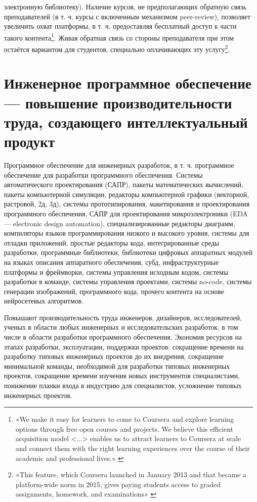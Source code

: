 \documentclass{article}
\begin{document}
электронную библиотеку). Наличие курсов, не предполагающих обратную связь преподавателей (в т. ч. курсы с включенным механизмом peer-review), позволяет увеличить охват платформы, в т. ч. предоставляя бесплатный доступ к части такого контента\footnote{«We make it easy for learners to come to Coursera and explore learning options through free open courses and projects. We believe this efficient acquisition model <...> enables us to attract learners to Coursera at scale and connect them with the right learning experiences over the course of their academic and professional lives.» \cite{courseraS1}}. Живая обратная связь со стороны преподавателя при этом остаётся вариантом для студентов, специально оплачивающих эту услугу\footnote{«This feature, which Coursera launched in January 2013 and that became a platform-wide norm in 2015, gives paying students access to graded assignments, homework, and examinations» \cite{howCourseraMakesMoney2022}}.

\section*{Инженерное программное обеспечение — повышение производительности труда, создающего интеллектуальный продукт}

Программное обеспечение для инженерных разработок, в т. ч. программное обеспечение для разработки программного обеспечения. Системы автоматического проектирования (САПР), пакеты математических вычислений, пакеты компьютерной симуляции, редакторы компьютерной графики (векторной, растровой, 2д, 3д), системы прототипирования, макетирования и проектирования программного обеспечения, САПР для проектирования микроэлектроники (EDA — electronic design automation), специализированные редакторы диаграмм, компиляторы языков программирования низкого и высокого уровня, системы для отладки приложений, простые редакторы кода, интегрированные среды разработки, программные библиотеки, библиотеки цифровых аппаратных модулей на языках описания аппаратного обеспечения, субд, инфраструктурные платформы и фреймворки, системы управления исходным кодом, системы разработки в команде, системы управления проектами, системы no-code, системы генерации изображений, программного кода, прочего контента на основе нейросетевых алгоритмов.

Повышают производительность труда инженеров, дизайнеров, исследователей, ученых в области любых инженерных и исследовательских разработок, в том числе в области разработки программного обеспечения. Экономия ресурсов на этапах разработки, эксплуатации, поддержки проектов: сокращение времени на разработку типовых инженерных проектов до их внедрения, сокращение минимальной команды, необходимой для разработки типовых инженерных проектов, сокращение времени изучения новых инструментов специалистами, понижение планки входа в индустрию для специалистов, усложнение типовых инженерных проектов.
\end{document}
